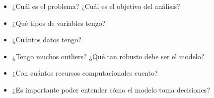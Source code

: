 \documentclass[aspectratio=169, usenames,dvipsnames]{beamer}
\begin{document}
\begin{frame}
        \pause

        \pause
           
\end{frame}

\begin{frame}
    \vfill
    \begin{itemize}
        \item<1-> ¿Cuál es el problema? ¿Cuál es el objetivo del análisis?
        \item<2-> ¿Qué tipos de variables tengo?
        \item<3-> ¿Cuántos datos tengo?
        \item<4-> \color{black!50!white}¿Tengo muchos outliers? ¿Qué tan robusto debe ser el modelo?
        \item<5-> \color{black!30!white}¿Con cuántos recursos computacionales cuento?
        \item<6-> \color{black!20!white}¿Es importante poder entender cómo el modelo toma decisiones?
    \end{itemize}
\end{frame}
\end{document}
